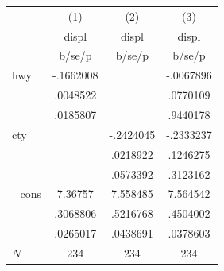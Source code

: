 {
\def\sym#1{\ifmmode^{#1}\else\(^{#1}\)\fi}
\begin{tabular}{l*{3}{c}}
\hline\hline
            &\multicolumn{1}{c}{(1)}&\multicolumn{1}{c}{(2)}&\multicolumn{1}{c}{(3)}\\
            &\multicolumn{1}{c}{displ}&\multicolumn{1}{c}{displ}&\multicolumn{1}{c}{displ}\\
            &      b/se/p&      b/se/p&      b/se/p\\
\hline
hwy         &   -.1662008&            &   -.0067896\\
            &    .0048522&            &    .0770109\\
            &    .0185807&            &    .9440178\\
cty         &            &   -.2424045&   -.2333237\\
            &            &    .0218922&    .1246275\\
            &            &    .0573392&    .3123162\\
\_cons      &     7.36757&    7.558485&    7.564542\\
            &    .3068806&    .5216768&    .4504002\\
            &    .0265017&    .0438691&    .0378603\\
\hline
\(N\)       &         234&         234&         234\\
\hline\hline
\end{tabular}
}
